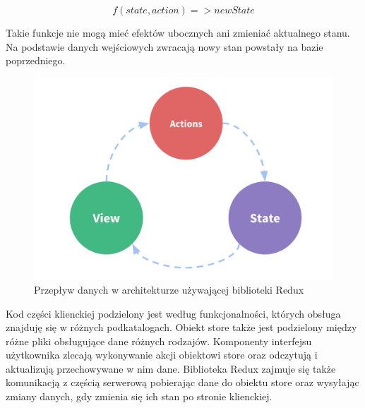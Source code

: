 \documentclass[shortabstract,inz]{iithesis}
\begin{document}
\[ f(state, action) => newState \]

Takie funkcje nie mogą mieć efektów ubocznych ani zmieniać aktualnego stanu. Na podstawie danych wejściowych zwracają nowy stan powstały na bazie poprzedniego.
\begin{figure}
	\centering
	\includegraphics[scale=0.5]{redux-flow.png}
	\caption{Przepływ danych w architekturze używającej biblioteki Redux}
	\label{fig:redux-flow}
\end{figure}

Kod części klienckiej podzielony jest według funkcjonalności, których obsługa znajduję się w różnych podkatalogach. Obiekt store także jest podzielony między różne pliki obsługujące dane różnych rodzajów. Komponenty interfejsu użytkownika zlecają wykonywanie akcji obiektowi store oraz odczytują i aktualizują przechowywane w nim dane. Biblioteka Redux zajmuje się także komunikacją z częścią serwerową pobierając dane do obiektu store oraz wysyłając zmiany danych, gdy zmienia się ich stan po stronie klienckiej.
\end{document}
